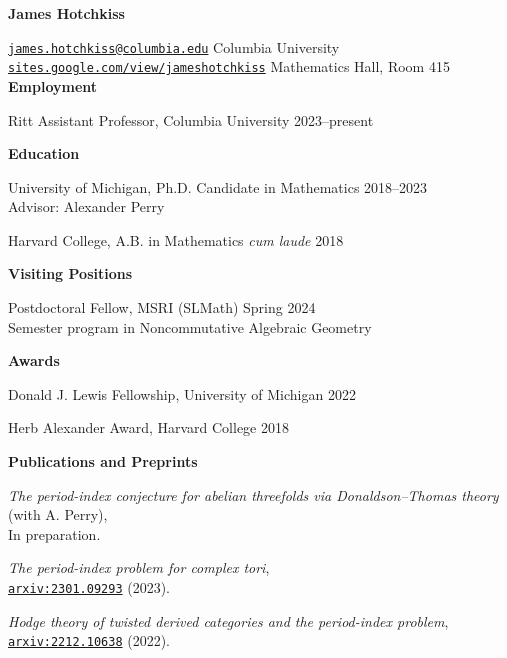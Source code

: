 \documentclass[11 pt]{letter}
\begin{document}
	\noindent
	\begin{center}
	 	\textbf{\Large James Hotchkiss}
	 \end{center} 
	\hrulefill 

	\noindent \href{mailto:james.hotchkiss@columbia.edu}{\nolinkurl{james.hotchkiss@columbia.edu}} \hfill Columbia University \\
	\href{https://sites.google.com/view/jameshotchkiss/james-hotchkiss}{\nolinkurl{sites.google.com/view/jameshotchkiss}}  \hfill Mathematics Hall, Room 415 \\



	\noindent
	\textbf{\large{Employment}}

	Ritt Assistant Professor, Columbia University \hfill 2023--present


	\noindent
	\textbf{\large{Education}}

	University of Michigan, Ph.D. Candidate in Mathematics \hfill 2018--2023 \\
	\indent Advisor: Alexander Perry

	Harvard College, A.B. in Mathematics \textit{cum laude} \hfill 2018

	\noindent
	\textbf{\large{Visiting Positions}}

	Postdoctoral Fellow, MSRI (SLMath) \hfill Spring 2024 \\
	\indent Semester program in Noncommutative Algebraic Geometry

	\medskip
	\noindent
	\textbf{\large{Awards}}

	Donald J. Lewis Fellowship, University of Michigan \hfill 2022 

	Herb Alexander Award, Harvard College \hfill 2018


	\medskip
	\noindent
	\textbf{\large{Publications and Preprints}}

	\emph{The period-index conjecture for abelian threefolds via Donaldson--Thomas theory} \\ \indent (with A. Perry), \\
	\indent In preparation. 

	\emph{The period-index problem for complex tori}, \\
	\indent \href{https://arxiv.org/abs/2301.09293}{\nolinkurl{arxiv:2301.09293}} (2023).

	\emph{Hodge theory of twisted derived categories and the period-index problem}, \\ 
	\indent \href{https://arxiv.org/abs/2212.10638}{\nolinkurl{arxiv:2212.10638}} (2022).
\end{document}
